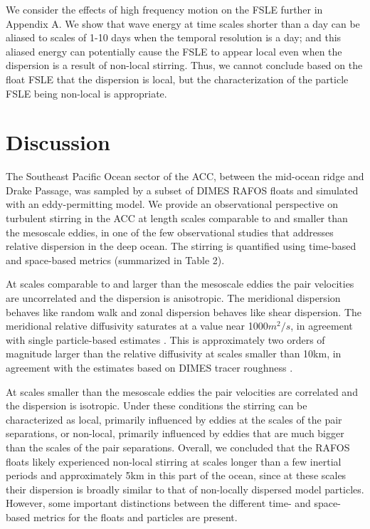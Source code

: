 \documentclass[]{ametsoc}
\begin{document}
We consider the effects of high frequency motion on the FSLE further in Appendix A. We show that wave energy at time scales shorter than a day can be aliased to scales of 1-10 days when the temporal resolution is a day; and this aliased energy can potentially cause the FSLE to appear local even when the dispersion is a result of non-local stirring. Thus, we cannot conclude based on the float FSLE that the dispersion is local, but the characterization of the particle FSLE being non-local is appropriate.

\section{Discussion} 
The Southeast Pacific Ocean sector of the ACC, between the mid-ocean ridge and Drake Passage, was sampled by a subset of DIMES RAFOS floats and simulated with an eddy-permitting model. We provide an observational perspective on turbulent stirring in the ACC at length scales comparable to and smaller than the mesoscale eddies, in one of the few observational studies that addresses relative dispersion in the deep ocean. The stirring is quantified using time-based and space-based metrics (summarized in Table 2).

At scales comparable to and larger than the mesoscale eddies the pair velocities are uncorrelated and the dispersion is anisotropic. The meridional dispersion behaves like random walk and zonal dispersion behaves like shear dispersion. 
The meridional relative diffusivity saturates at a value near 1000$m^2/s$, in agreement with single particle-based estimates \citep{balwada2016, lacasce2014, tulloch2014direct}. This is approximately two orders of magnitude larger than the relative diffusivity at scales smaller than 10km, in agreement with the estimates based on DIMES tracer roughness \citep{boland2015}.

At scales smaller than the mesoscale eddies the pair velocities are correlated and the dispersion is isotropic. Under these conditions the stirring can be characterized as local, primarily influenced by eddies at the scales of the pair separations, or non-local, primarily influenced by eddies that are much bigger than the scales of the pair separations. Overall, we concluded that the RAFOS floats likely experienced non-local stirring at scales longer than a few inertial periods and approximately 5km in this part of the ocean, since at these scales their dispersion is broadly similar to that of non-locally dispersed model particles. 
However, some important distinctions between the different time- and space-based metrics for the floats and particles are present. 
\end{document}
